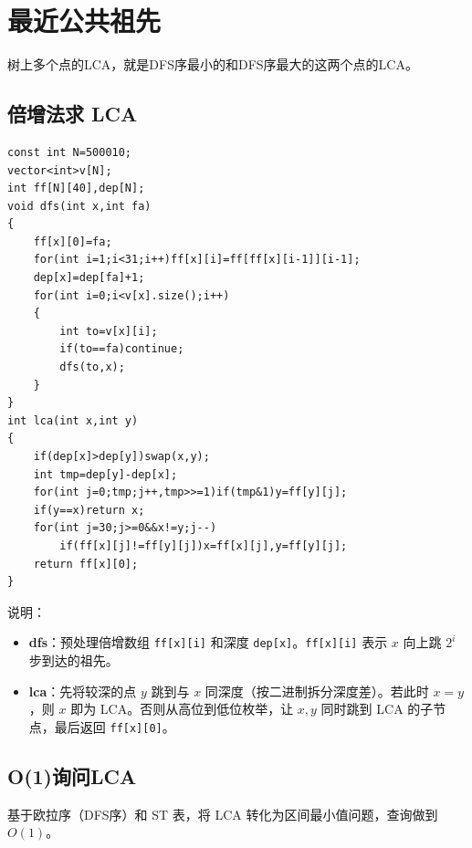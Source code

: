 \section{最近公共祖先}
\par \noindent 树上多个点的LCA，就是DFS序最小的和DFS序最大的这两个点的LCA。

\subsection{倍增法求 LCA}
\begin{verbatim}
const int N=500010;
vector<int>v[N];
int ff[N][40],dep[N];
void dfs(int x,int fa)
{
    ff[x][0]=fa;
    for(int i=1;i<31;i++)ff[x][i]=ff[ff[x][i-1]][i-1];
    dep[x]=dep[fa]+1;
    for(int i=0;i<v[x].size();i++)
    {
        int to=v[x][i];
        if(to==fa)continue;
        dfs(to,x);
    }
}
int lca(int x,int y)
{
    if(dep[x]>dep[y])swap(x,y);
    int tmp=dep[y]-dep[x];
    for(int j=0;tmp;j++,tmp>>=1)if(tmp&1)y=ff[y][j];
    if(y==x)return x;
    for(int j=30;j>=0&&x!=y;j--)
        if(ff[x][j]!=ff[y][j])x=ff[x][j],y=ff[y][j];
    return ff[x][0];
}
\end{verbatim}

\par \noindent 说明：
\begin{itemize}
\item \textbf{dfs}：预处理倍增数组 \texttt{ff[x][i]} 和深度 \texttt{dep[x]}。\texttt{ff[x][i]} 表示 $x$ 向上跳 $2^i$ 步到达的祖先。
\item \textbf{lca}：先将较深的点 $y$ 跳到与 $x$ 同深度（按二进制拆分深度差）。若此时 $x=y$，则 $x$ 即为 LCA。否则从高位到低位枚举，让 $x,y$ 同时跳到 LCA 的子节点，最后返回 \texttt{ff[x][0]}。
\end{itemize}

\subsection{O(1)询问LCA}
\par \noindent 基于欧拉序（DFS序）和 ST 表，将 LCA 转化为区间最小值问题，查询做到 $O(1)$。

